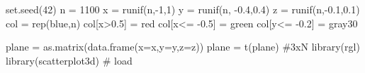 \documentclass[
  letterpaper,
  DIV=11,
  numbers=noendperiod]{scrartcl}
\newenvironment{Shaded}{\begin{snugshade}}{\end{snugshade}}
\newcommand{\AttributeTok}[1]{\textcolor[rgb]{0.40,0.45,0.13}{#1}}
\newcommand{\CommentTok}[1]{\textcolor[rgb]{0.37,0.37,0.37}{#1}}
\newcommand{\DecValTok}[1]{\textcolor[rgb]{0.68,0.00,0.00}{#1}}
\newcommand{\FloatTok}[1]{\textcolor[rgb]{0.68,0.00,0.00}{#1}}
\newcommand{\FunctionTok}[1]{\textcolor[rgb]{0.28,0.35,0.67}{#1}}
\newcommand{\NormalTok}[1]{\textcolor[rgb]{0.00,0.23,0.31}{#1}}
\newcommand{\OtherTok}[1]{\textcolor[rgb]{0.00,0.23,0.31}{#1}}
\newcommand{\SpecialCharTok}[1]{\textcolor[rgb]{0.37,0.37,0.37}{#1}}
\newcommand{\StringTok}[1]{\textcolor[rgb]{0.13,0.47,0.30}{#1}}
\begin{document}
\begin{Shaded}
\begin{Highlighting}[]
\FunctionTok{set.seed}\NormalTok{(}\DecValTok{42}\NormalTok{)}
\NormalTok{n }\OtherTok{=} \DecValTok{1100}
\NormalTok{x }\OtherTok{=} \FunctionTok{runif}\NormalTok{(n,}\SpecialCharTok{{-}}\DecValTok{1}\NormalTok{,}\DecValTok{1}\NormalTok{)}
\NormalTok{y }\OtherTok{=} \FunctionTok{runif}\NormalTok{(n, }\SpecialCharTok{{-}}\FloatTok{0.4}\NormalTok{,}\FloatTok{0.4}\NormalTok{)}
\NormalTok{z }\OtherTok{=} \FunctionTok{runif}\NormalTok{(n,}\SpecialCharTok{{-}}\FloatTok{0.1}\NormalTok{,}\FloatTok{0.1}\NormalTok{)}
\NormalTok{col }\OtherTok{=} \FunctionTok{rep}\NormalTok{(}\StringTok{\textquotesingle{}blue\textquotesingle{}}\NormalTok{,n)}
\NormalTok{col[x}\SpecialCharTok{\textgreater{}}\FloatTok{0.5}\NormalTok{] }\OtherTok{=} \StringTok{\textquotesingle{}red\textquotesingle{}}
\NormalTok{col[x}\SpecialCharTok{\textless{}=} \SpecialCharTok{{-}}\FloatTok{0.5}\NormalTok{] }\OtherTok{=} \StringTok{\textquotesingle{}green\textquotesingle{}}
\NormalTok{col[y}\SpecialCharTok{\textless{}=} \SpecialCharTok{{-}}\FloatTok{0.2}\NormalTok{] }\OtherTok{=} \StringTok{\textquotesingle{}gray30\textquotesingle{}}

\NormalTok{plane }\OtherTok{=} \FunctionTok{as.matrix}\NormalTok{(}\FunctionTok{data.frame}\NormalTok{(}\AttributeTok{x=}\NormalTok{x,}\AttributeTok{y=}\NormalTok{y,}\AttributeTok{z=}\NormalTok{z))}
\NormalTok{plane }\OtherTok{=} \FunctionTok{t}\NormalTok{(plane) }\CommentTok{\#3xN}
\FunctionTok{library}\NormalTok{(rgl)}
\FunctionTok{library}\NormalTok{(scatterplot3d) }\CommentTok{\# load}
 


\end{Highlighting}
\end{Shaded}
\end{document}
